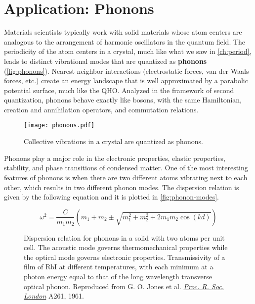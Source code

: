 \section{Application: Phonons}

Materials scientists typically work with solid materials whose atom centers are analogous to the arrangement of harmonic oscillators in the quantum field. 
The periodicity of the atom centers in a crystal, much like what we saw in \autoref{ch:period}, leads to distinct vibrational modes that are quantized as \textbf{phonons} (\autoref{fig:phonons}). 
Nearest neighbor interactions (electrostatic forces, van der Waals forces, etc.) create an energy landscape that is well approximated by a parabolic potential surface, much like the QHO. 
Analyzed in the framework of second quantization, phonons behave exactly like bosons, with the same Hamiltonian, creation and annihilation operators, and commutation relations. 

\begin{figure}[!h]
	\centering
	\texttt{[image: phonons.pdf]}
	\caption{Collective vibrations in a crystal are quantized as phonons.}
	\label{fig:phonons}
\end{figure}

Phonons play a major role in the electronic properties, elastic properties, stability, and phase transitions of condensed matter. 
One of the most interesting features of phonons is when there are two different atoms vibrating next to each other, which results in two different phonon modes. 
The dispersion relation is given by the following equation and it is plotted in \autoref{fig:phonon-modes}.

\begin{equation}
	\omega^2 = \frac{C}{m_1m_2} \left(m_1 + m_2 \pm \sqrt{m_1^2 + m_2^2 + 2m_1m_2\cos(kd)}\right)
\end{equation}

\begin{figure}[!h]
	\centering
	 \hspace{3ex}
	\caption{\protect{} Dispersion relation for phonons in a solid with two atoms per unit cell. The acoustic mode governs thermomechanical properties while the optical mode governs electronic properties. \protect{} Transmissivity of a film of RbI at different temperatures, with each minimum at a photon energy equal to that of the long wavelength transverse optical phonon. Reproduced from G. O. Jones et al. \href{http://rspa.royalsocietypublishing.org/content/261/1304/10}{\emph{Proc. R. Soc. London}} A261, 1961.}
	\label{fig:phonon-modes}
\end{figure}

